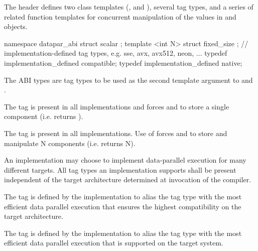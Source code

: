 

\pnum
The header  defines two class templates (\datapar, and \mask), several tag types, and a series of related function templates for concurrent manipulation of the values in \datapar and \mask objects.

\begin{itemdecl}
namespace datapar_abi {
  struct scalar {};
  template <int N> struct fixed_size {};
  // implementation-defined tag types, e.g. sse, avx, avx512, neon, ...
  typedef implementation_defined compatible;
  typedef implementation_defined native;
}
\end{itemdecl}
\begin{itemdescr}
  \pnum
  The ABI types are tag types to be used as the second template argument to \datapar and \mask.

  \pnum
  The  tag is present in all implementations and forces \datapar and \mask to store a single component (i.e. \datapar{} returns ).

  \pnum
  The  tag is present in all implementations.
  Use of  forces \datapar and \mask to store and manipulate \code N components (i.e. \datapar{} returns \code N).

  \pnum
  An implementation may choose to implement data-parallel execution for many different targets.
  All tag types an implementation supports shall be present independent of the target architecture determined at invocation of the compiler.

  \pnum
  The  tag is defined by the implementation to alias the tag type with the most efficient data parallel execution that ensures the highest compatibility on the target architecture.

  \pnum
  The  tag is defined by the implementation to alias the tag type with the most efficient data parallel execution that is supported on the target system.
\end{itemdescr}

